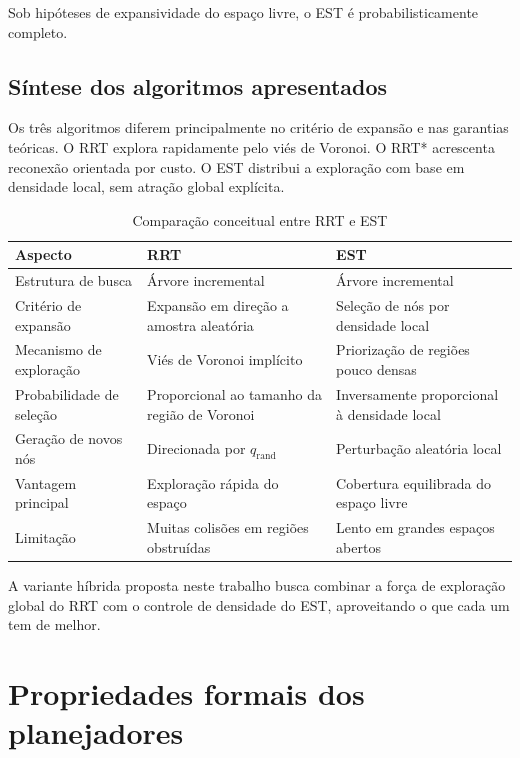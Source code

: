 Sob hipóteses de expansividade do espaço livre, o EST é probabilisticamente completo.

\subsection{Síntese dos algoritmos apresentados}
\label{subsec:sintese_algoritmos}

Os três algoritmos diferem principalmente no critério de expansão e nas garantias teóricas. O RRT explora rapidamente pelo viés de Voronoi. O RRT* acrescenta reconexão orientada por custo. O EST distribui a exploração com base em densidade local, sem atração global explícita.

\begin{table}[H]
\centering
\caption{Comparação conceitual entre RRT e EST}
\label{tab:comparacao_rrt_est}
\begin{tabular}{@{}p{4cm}p{5cm}p{5cm}@{}}
\toprule
\textbf{Aspecto} & \textbf{RRT} & \textbf{EST} \\ \midrule
Estrutura de busca & Árvore incremental & Árvore incremental \\
Critério de expansão & Expansão em direção a amostra aleatória & Seleção de nós por densidade local \\
Mecanismo de exploração & Viés de Voronoi implícito & Priorização de regiões pouco densas \\
Probabilidade de seleção & Proporcional ao tamanho da região de Voronoi & Inversamente proporcional à densidade local \\
Geração de novos nós & Direcionada por $q_{\mathrm{rand}}$ & Perturbação aleatória local \\
Vantagem principal & Exploração rápida do espaço & Cobertura equilibrada do espaço livre \\
Limitação & Muitas colisões em regiões obstruídas & Lento em grandes espaços abertos \\ \bottomrule
\end{tabular}
\end{table}

A variante híbrida proposta neste trabalho busca combinar a força de exploração global do RRT com o controle de densidade do EST, aproveitando o que cada um tem de melhor.

\section{Propriedades formais dos planejadores}
\label{sec:propriedades_formais}

